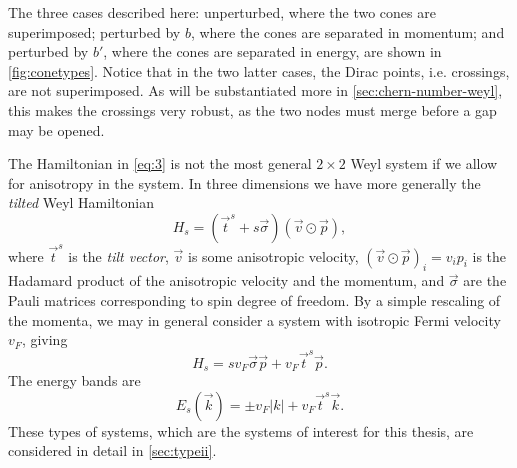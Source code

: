 The three cases described here: unperturbed, where the two cones are superimposed; perturbed by $b$, where the cones are separated in momentum; and perturbed by $b'$, where the cones are separated in energy, are shown in \cref{fig:conetypes}.
Notice that in the two latter cases, the Dirac points, i.e. crossings, are not superimposed.
As will be substantiated more in \cref{sec:chern-number-weyl}, this makes the crossings very robust, as the two nodes must merge before a gap may be opened.


The Hamiltonian in \cref{eq:3} is not the most general \( 2 \times 2 \) Weyl system if we allow for anisotropy in the system.
In three dimensions we have more generally the \emph{tilted} Weyl Hamiltonian
\begin{equation}
  \label{eq:4}
  H_s = (\vec{t}^{s} + s \vec{\sigma}) (\vec{v} \odot \vec{p}),
\end{equation}
where $\vec{t}^{s}$ is  the \emph{tilt vector}, $\vec{v}$ is some anisotropic velocity, $(\vec{v} \odot \vec{p})_i = v_i p_i$ is the Hadamard product of the anisotropic velocity and the momentum,  and $\vec{\sigma}$ are the Pauli matrices corresponding to spin degree of freedom.
By a simple rescaling of the momenta, we may in general consider a system with isotropic Fermi velocity \( v_F \), giving
\begin{equation}
  \label{eq:hamil-tilt-isotropic}
  H_s = s v_F \vec{\sigma} \vec{p} + v_F \vec{t}^s \vec{p}.
\end{equation}
The energy bands are
\begin{equation}
  \label{eq:tilted-eigenvalue}
  E_s(\vec{k}) = \pm v_F |k| + v_F \vec{t}^{s} \vec{k}.
\end{equation}
These types of systems, which are the systems of interest for this thesis, are considered in detail in \cref{sec:typeii}.

